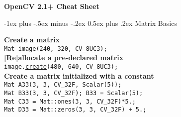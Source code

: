 \documentclass[10pt,landscape]{article}
\makeatletter
\renewcommand{\section}{\@startsection{section}{1}{0mm}%
                                {-1ex plus -.5ex minus -.2ex}%
                                {0.5ex plus .2ex}%
                                {\normalfont\large\bfseries}}
\makeatother
\begin{document}
\raggedright
\footnotesize
\begin{multicols}{3}


\setlength{\premulticols}{1pt}
\setlength{\postmulticols}{1pt}
\setlength{\multicolsep}{1pt}
\setlength{\columnsep}{2pt}

\begin{center}
     \Large{\textbf{OpenCV 2.1+ Cheat Sheet}} \\
\end{center}
\newlength{\MyLen}


\section{Matrix Basics}
\begin{tabbing}

\textbf{Cr}\=\textbf{ea}\=\textbf{te}\={} \textbf{a matrix} \\
\> \texttt{Mat image(240, 320, CV\_8UC3);} \\

\textbf{[Re]allocate a pre-declared matrix}\\
\> \texttt{image.\href{http://opencv.willowgarage.com/documentation/cpp/basic_structures.html\#Mat::create}{create}(480, 640, CV\_8UC3);}\\

\textbf{Create a matrix initialized with a constant}\\
\> \texttt{Mat A33(3, 3, CV\_32F, Scalar(5));} \\
\> \texttt{Mat B33(3, 3, CV\_32F); B33 = Scalar(5);} \\
\> \texttt{Mat C33 = Mat::ones(3, 3, CV\_32F)*5.;} \\
\> \texttt{Mat D33 = Mat::zeros(3, 3, CV\_32F) + 5.;} \\


\end{tabbing}
\end{multicols}
\end{document}
